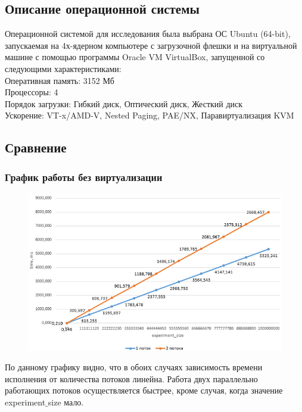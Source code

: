 \documentclass{article}
\begin{document}
	\subsection{Описание операционной системы}
	Операционной системой для исследования была выбрана ОС Ubuntu (64-bit), запускаемая на 4х-ядерном компьютере с загрузочной флешки и на виртуальной машине с помощью программы Oracle VM VirtualBox, запущенной со следующими характеристиками:\\
		Оперативная память:	3152 Мб\\
		Процессоры:	4\\
		Порядок загрузки:	Гибкий диск, Оптический диск, Жесткий диск\\
		Ускорение:	VT-x/AMD-V, Nested Paging, PAE/NX, Паравиртуализация KVM\\
	\subsection{Сравнение}
	\subsubsection{График работы без виртуализации}
		\begin{figure}[h]
			\includegraphics{withoutVirt.png}
			\label{ris:without}
		\end{figure}
		По данному графику видно, что в обоих случаях зависимость времени исполнения от количества потоков линейна. Работа двух параллельно работающих потоков осуществляется быстрее, кроме случая, когда значение experiment$\_$size мало.
\newpage
\end{document}
